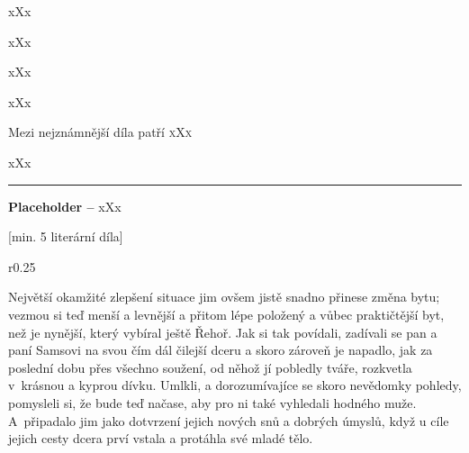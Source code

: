 \documentclass{extarticle} %
\begin{document}
\noindent 
xXx

\noindent 
xXx

\noindent 
xXx






\noindent 
xXx


\noindent 
Mezi nejznámnější díla patří \textsc{xXx}






\noindent 
xXx

\vfill

\noindent\begin{minipage}{\textwidth}
    {\textcolor{\wpagecolor}{\rule{\linewidth}{0.4pt}}
    \footnotesize
    \textbf{Placeholder --} xXx
    }
\end{minipage}

\newpage

[min. 5 literární díla]


\changefontsize{8pt}


\noindent\begin{wrapfigure}{r}{0.25\textwidth}
\tiny

\setlength{\parindent}{3pt}
Největší okamžité zlepšení situace jim ovšem jistě snadno přinese změna bytu;
vezmou si teď menší a levnější a přitom lépe položený a vůbec praktičtější byt,
než je nynější, který vybíral ještě Řehoř.
Jak si tak povídali, zadívali se pan a paní Samsovi na svou čím dál čilejší dceru
a skoro zároveň je napadlo, jak za poslední dobu přes všechno soužení,
od něhož jí pobledly tváře, rozkvetla v~krásnou a kyprou dívku.
Umlkli, a dorozumívajíce se skoro nevědomky pohledy, pomysleli si,
že bude teď načase, aby pro ni také vyhledali hodného muže.
A~připadalo jim jako dotvrzení jejich nových snů a dobrých úmyslů,
když u cíle jejich cesty dcera prví vstala a protáhla své mladé tělo.
\end{wrapfigure}
\end{document}

